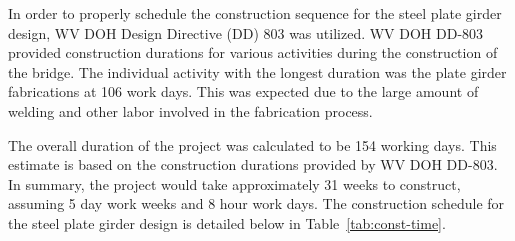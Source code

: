 In order to properly schedule the construction sequence for the steel plate girder design, WV DOH Design Directive (DD) 803 was utilized. WV DOH DD-803 provided construction durations for various activities during the construction of the bridge. The individual activity with the longest duration was the plate girder fabrications at 106 work days. This was expected due to the large amount of welding and other labor involved in the fabrication process.

The overall duration of the project was calculated to be 154 working days. This estimate is based on the construction durations provided by WV DOH DD-803. In summary, the project would take approximately 31 weeks to construct, assuming 5 day work weeks and 8 hour work days. The construction schedule for the steel plate girder design is detailed below in Table~\ref{tab:const-time}.

